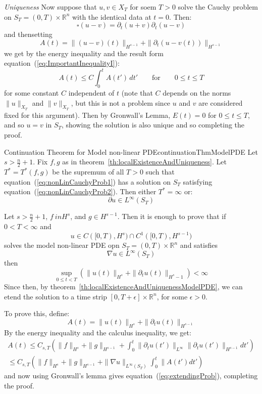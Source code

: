 \documentclass{book}
\newenvironment{Proof}[1][]
  {\begin{ProofTcb}[#1]}
  {\end{ProofTcb}}
\newcommand{\R}{{\mathbb{R}}}
\begin{document}
\begin{Proof}
	\emph{Uniqueness} Now suppose that $u,v \in X_T$ for soem $T > 0$ solve the Cauchy problem on $S_T
	= (0,T)\times \R^n$ with the identical data at $t = 0$. Then:
	\[
		\square (u-v) =  \partial_t (u+v)   \partial_t(u-v)
	\]
	and thensetting
	\[
		A(t) = \|(u-v)(t)\|_{H^{s-1}} + \|  \partial_t(u-v(t))\|_{H^{s-1}}
	\]
	we get by the energy inequality and the result form equation~(\ref{eq:ImportantInequalityI}):
	\[
		A(t) \le C\int_{0}^t A(t')\,dt' \qquad \text{for} \qquad  0 \le t \le T
	\]
	for some constant $C$ independent of $t$ (note that $C$ depends on the norms $\|u\|_{X_T}$ and $\|v\|_{X_T}$,
	but this is not a problem since $u$ and $v$ are considered fixed for this argument). Then by Gronwall's Lemma,
	$E(t) = 0$ for $0 \le t \le T$, and so $u = v$ in $S_T$, showing the solution is also unique and so completing
	the proof.
\end{Proof}

\begin{thm}{Continuation Theorem for Model non-linear PDE}{continuationThmModelPDE}
	Let $s > \frac{n}{2} + 1$. Fix $f,g$ as in theorem~\ref{th:localExistenceAndUniqueness}. Let $T^* = T^*(f,g)$ be the
	supremum of all $T> 0$ such that equation~(\ref{eq:nonLinCauchyProb1}) has a solution on $S_T$ satisfying
	equation~(\ref{eq:nonLinCauchyProb2}). Then either $T^* = \infty$ or:
	\[
		 \partial u \in L^\infty(S_T)
	 \]
\end{thm}

\begin{Proof}
	Let $s > \frac{n}{2} + 1$, $f\ in H^s$, and $g \in H^{s-1}$. Then it is enough to prove that if $0
	< T < \infty$ and
	\[
		u \in C([0, T), H^s) \cap C^1([0, T), H^{s-1})
	\]
	solves the model non-linear PDE opn $S_T = (0, T)\times \R^n$ and satisfies
	\[
		 \nabla u \in L^\infty (S_T)
	 \]
	 then
	 \[
		 \sup_{0 \le t <T} ( \|u(t )\|_{H^s} + \|  \partial_t u(t)\|_{H^s-1}) < \infty
	 \]
	 Since then, by theorem~\ref{th:localExistenceAndUniquenessModelPDE}, we can etend the solution to a time strip
	 $[0, T + \epsilon] \times \R^n$, for some $\epsilon > 0$.

	 To prove this, define:
	 \begin{equation}\label{eq:extendingProb}
	   A(t) = \|u(t)\|_{H^s} + \|  \partial_t u(t)\|_{H^{s-1}}
	 \end{equation}
	 By the energy inequality and the calculus inequality, we get:
	 \begin{align*}
		 A(t) \le C_{s,T} \left( \|f\|_{H^s} + \|g\|_{H^{s-1}} + \int_0^t \|  \partial_t u(t')\|_{L^\infty} \|
		 \partial_t u(t')\|_{H^{s-1}} dt'\right)\\
		 \le C_{s,T} \left(  \|f\|_{H^s} + \|g\|_{H^{s-1}} + \|\nabla u\|_{L^\infty(S_T)} \int_0^t \|
		 A(t')dt'\right)
	 \end{align*}
	 and now using Gronwall's lemma gives equation~(\ref{eq:extendingProb}), completing the proof.
\end{Proof}
\end{document}
